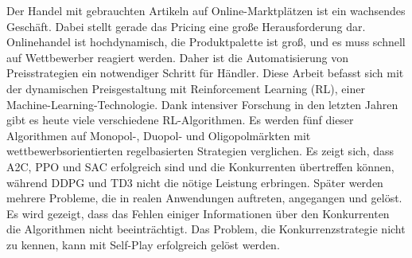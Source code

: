 Der Handel mit gebrauchten Artikeln auf Online-Marktplätzen ist ein wachsendes Geschäft.
Dabei stellt gerade das Pricing eine große Herausforderung dar.
Onlinehandel ist hochdynamisch, die Produktpalette ist groß, und es muss schnell auf Wettbewerber reagiert werden.
Daher ist die Automatisierung von Preisstrategien ein notwendiger Schritt für Händler.
Diese Arbeit befasst sich mit der dynamischen Preisgestaltung mit Reinforcement Learning (RL), einer Machine-Learning-Technologie.
Dank intensiver Forschung in den letzten Jahren gibt es heute viele verschiedene RL-Algorithmen.
Es werden fünf dieser Algorithmen auf Monopol-, Duopol- und Oligopolmärkten mit wettbewerbsorientierten regelbasierten Strategien verglichen.
Es zeigt sich, dass A2C, PPO und SAC erfolgreich sind und die Konkurrenten übertreffen können, während DDPG und TD3 nicht die nötige Leistung erbringen.
Später werden mehrere Probleme, die in realen Anwendungen auftreten, angegangen und gelöst.
Es wird gezeigt, dass das Fehlen einiger Informationen über den Konkurrenten die Algorithmen nicht beeinträchtigt.
Das Problem, die Konkurrenzstrategie nicht zu kennen, kann mit Self-Play erfolgreich gelöst werden.